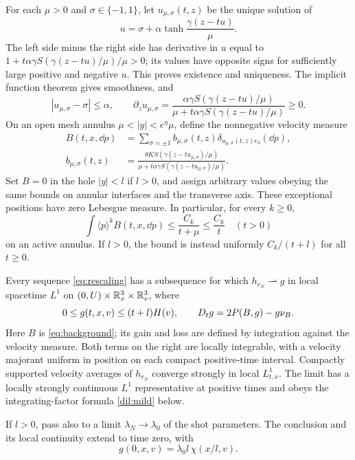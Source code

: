 For each \(\mu>0\) and \(\sigma\in\{-1,1\}\), let
\(u_{\mu,\sigma}(t,z)\) be the unique solution of
\[
u=\sigma+\alpha\tanh\frac{\gamma(z-tu)}\mu.
\]
The left side minus the right side has derivative in \(u\) equal to
\(1+t\alpha\gamma S(\gamma(z-tu)/\mu)/\mu>0\); its values have
opposite signs for sufficiently large positive and negative \(u\).
This proves existence and uniqueness. The implicit function theorem
gives smoothness, and
\[
|u_{\mu,\sigma}-\sigma|\leq\alpha,
\qquad
\partial_z u_{\mu,\sigma}
=\frac{\alpha\gamma S(\gamma(z-tu)/\mu)}
       {\mu+t\alpha\gamma S(\gamma(z-tu)/\mu)}\geq0.
\]
On an open mesh annulus \(\mu<|y|<e^\eta\mu\), define the
nonnegative velocity measure
\begin{equation}\label{eq:background}
\begin{split}
B(t,x,\dd p)
&=\sum_{\sigma=\pm1}b_{\mu,\sigma}(t,z)
                         \delta_{u_{\mu,\sigma}(t,z)e_3}(\dd p),\\
b_{\mu,\sigma}(t,z)
&=\frac{\theta K S(\gamma(z-tu_{\mu,\sigma})/\mu)}
 {\mu+t\alpha\gamma S(\gamma(z-tu_{\mu,\sigma})/\mu)}.
\end{split}
\end{equation}
Set \(B=0\) in the hole \(|y|<l\) if \(l>0\), and assign arbitrary
values obeying the same bounds on annular interfaces and the transverse
axis. These exceptional positions have zero Lebesgue measure. In
particular, for every \(k\geq0\),
\begin{equation}\label{dil:background-bound}
\int\langle p\rangle^kB(t,x,\dd p)
\leq\frac{C_k}{t+\mu}\leq\frac{C_k}{t}
\quad(t>0)
\end{equation}
on an active annulus. If \(l>0\), the bound is instead uniformly
\(C_k/(t+l)\) for all \(t\geq0\).

\begin{proposition}\label{prop:blowup-limit}
Every sequence \eqref{eq:rescaling} has a subsequence for which
\(h_{r_N}\rightharpoonup g\) in local spacetime \(L^1\) on
\((0,U)\times\mathbb R^3_x\times\mathbb R^3_v\), where
\begin{equation}\label{eq:limit-equation}
0\leq g(t,x,v)\leq(t+l)H(v),\qquad
D_t g=2P(B,g)-g\nu_B.
\end{equation}
Here \(B\) is \eqref{eq:background}; its gain and loss are defined by
integration against the velocity measure. Both terms on the right are
locally integrable, with a velocity majorant uniform in position on
each compact positive-time interval. Compactly supported velocity
averages of \(h_{r_N}\) converge strongly in local \(L^1_{t,x}\).
The limit has a locally strongly continuous \(L^1\) representative
at positive times and obeys the integrating-factor formula
\eqref{dil:mild} below.

If \(l>0\), pass also to a limit \(\lambda_N\to\lambda_0\) of the
shot parameters. The conclusion and its local continuity extend to
time zero, with
\begin{equation}\label{dil:initial-trace}
g(0,x,v)=\lambda_0 l\,\chi(x/l,v).
\end{equation}
\end{proposition}

